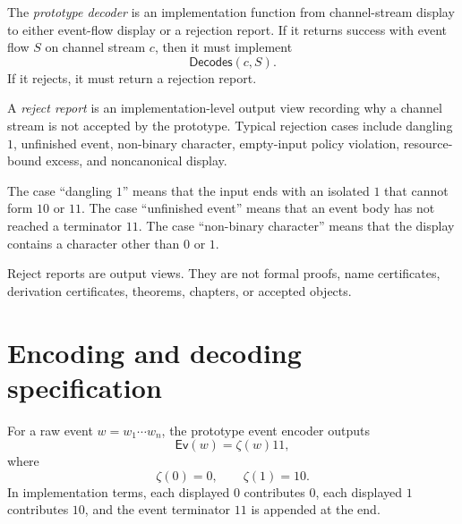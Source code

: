 \begin{definition}
\label{def:minimal-prototype-decoder}
The \emph{prototype decoder} is an implementation function from channel-stream display to either event-flow display or a rejection report. If it returns success with event flow $S$ on channel stream $c$, then it must implement
$$
  \mathsf{Decodes}(c,S).
$$
If it rejects, it must return a rejection report.
\end{definition}

\begin{definition}
\label{def:minimal-prototype-reject-report}
A \emph{reject report} is an implementation-level output view recording why a channel stream is not accepted by the prototype. Typical rejection cases include dangling $1$, unfinished event, non-binary character, empty-input policy violation, resource-bound excess, and noncanonical display.

The case ``dangling $1$'' means that the input ends with an isolated $1$ that cannot form $10$ or $11$. The case ``unfinished event'' means that an event body has not reached a terminator $11$. The case ``non-binary character'' means that the display contains a character other than $0$ or $1$.
\end{definition}

\begin{principle}
\label{prin:minimal-prototype-reject-reports-output}
Reject reports are output views. They are not formal proofs, name certificates, derivation certificates, theorems, chapters, or accepted objects.
\end{principle}

\section{Encoding and decoding specification}
\label{sec:minimal-prototype-encoding-decoding}

\begin{definition}
\label{def:minimal-prototype-event-encoder}
For a raw event $w=w_1\cdots w_n$, the prototype event encoder outputs
$$
  \mathsf{Ev}(w)=\zeta(w)11,
$$
where
$$
  \zeta(0)=0,
  \qquad
  \zeta(1)=10.
$$
In implementation terms, each displayed $0$ contributes $0$, each displayed $1$ contributes $10$, and the event terminator $11$ is appended at the end.
\end{definition}

